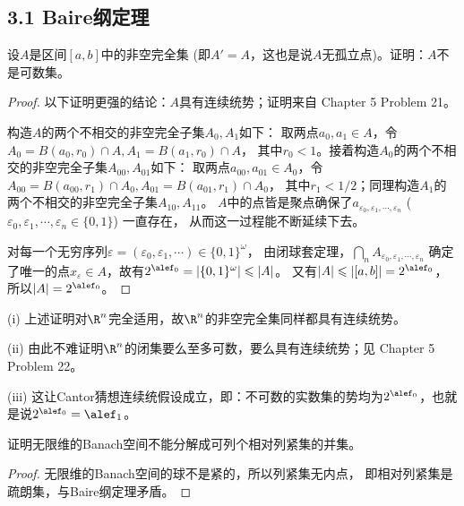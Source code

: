\subsection{3.1 Baire纲定理}
\begin{3}
    设$A$是区间$[a,b]$中的非空完全集 (即$A'=A$，这也是说$A$无孤立点)。证明：$A$不是可数集。
\end{3}
\begin{proof}
    以下证明更强的结论：$A$具有连续统势；证明来自\cite{KT} Chapter 5 Problem 21。
    
    构造$A$的两个不相交的非空完全子集$A_0,A_1$如下：
    取两点$a_0,a_1 \in A$，令$A_0=B(a_0,r_0) \cap A,A_1=B(a_1,r_0) \cap A$，
    其中$r_0<1$。接着构造$A_0$的两个不相交的非空完全子集$A_{00},A_{01}$如下：
    取两点$a_{00},a_{01} \in A_0$，令$A_{00}=B(a_{00},r_1) \cap A_0,A_{01}=B(a_{01},r_1) \cap A_0$，
    其中$r_1<1/2$；同理构造$A_1$的两个不相交的非空完全子集$A_{10},A_{11}$。
    $A$中的点皆是聚点确保了$a_{\varepsilon_0,\varepsilon_1,\cdots,\varepsilon_n}$
    ($\varepsilon_0,\varepsilon_1,\cdots,\varepsilon_n\in\{0,1\}$) 一直存在，
    从而这一过程能不断延续下去。
    
    对每一个无穷序列$\varepsilon=(\varepsilon_0,\varepsilon_1,\cdots)\in\{0,1\}^\omega$，
    由闭球套定理，$\bigcap\limits_{n}A_{\varepsilon_0,\varepsilon_1,\cdots,\varepsilon_n}$
    确定了唯一的点$x_\varepsilon \in A$，故有$2^{\alef_0}=|\{0,1\}^\omega|\leqslant|A|$。
    又有$|A|\leqslant|[a,b]|=2^{\alef_0}$，所以$|A|=2^{\alef_0}$。
\end{proof}
\begin{remark*}
(i) 上述证明对$\R^n$完全适用，故$\R^n$的非空完全集同样都具有连续统势。

(ii) 由此不难证明$\R^n$的闭集要么至多可数，要么具有连续统势；见\cite{KT} Chapter 5 Problem 22。

(iii) 这让Cantor猜想连续统假设成立，即：不可数的实数集的势均为$2^{\alef_0}$，也就是说$2^{\alef_0}=\alef_1$。
\end{remark*}

\begin{4}
    证明无限维的Banach空间不能分解成可列个相对列紧集的并集。
\end{4}
\begin{proof}
    无限维的Banach空间的球不是紧的，所以列紧集无内点，
    即相对列紧集是疏朗集，与Baire纲定理矛盾。
\end{proof}

